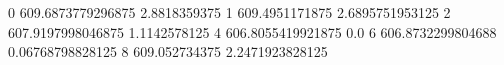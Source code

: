 0 609.6873779296875 2.8818359375
1 609.4951171875 2.6895751953125
2 607.9197998046875 1.1142578125
4 606.8055419921875 0.0
6 606.8732299804688 0.06768798828125
8 609.052734375 2.2471923828125

